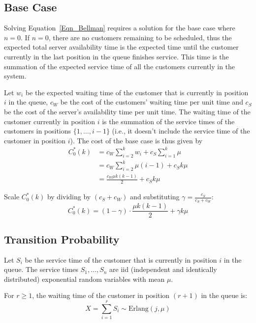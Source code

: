 \subsection{Base Case}
Solving Equation~\ref{Eqn_Bellman} requires a solution for the base case where $n = 0$. If $n = 0$, there are no customers remaining to be scheduled, thus the expected total server availability time is the expected time until the customer currently in the last position in the queue finishes service. This time is the summation of the expected service time of all the customers currently in the system.

Let $w_{i}$ be the expected waiting time of the customer that is currently in position $i$ in the queue, $c_{W}$ be the cost of the customers' waiting time per unit time and $c_{S}$ be the cost of the server's availability time per unit time. The waiting time of the customer currently in position $i$ is the summation of the service times of the customers in positions $\{ 1, \ldots, i - 1 \}$ (i.e., it doesn't include the service time of the customer in position $i$). The cost of the base case is thus given by
\begin{align*}
 	C_{0}^{*} (k) & = c_{W} \sum_{i = 2}^{k} w_{i} + c_{S} \sum_{i = 1}^{k} \mu \\
 	& = c_{W} \sum_{i = 2}^{k} \mu (i - 1) + c_{S} k \mu \\
 	& = \frac{c_{W} \mu k (k - 1)}{2} + c_{S} k \mu
\end{align*}

Scale $C_{0}^{*} (k)$ by dividing by $(c_{S} + c_{W})$ and substituting $\gamma = \frac{c_{S}}{c_{S} + c_{W}}$:
\begin{equation}
	C_{0}^{*} (k) = (1 - \gamma) \cdot \frac{\mu k (k - 1)}{2} + \gamma k \mu
\end{equation}

\subsection{Transition Probability}
Let $S_{i}$ be the service time of the customer that is currently in position $i$ in the queue. The service times $S_{1}, \ldots, S_{n}$ are iid (independent and identically distributed) exponential random variables with mean $\mu$.

For $r \geq 1$, the waiting time of the customer in position $(r + 1)$ in the queue is:
\begin{equation}
	X = \sum_{i = 1}^{r} S_{i} \sim \text{Erlang}(j, \mu)
\end{equation}

